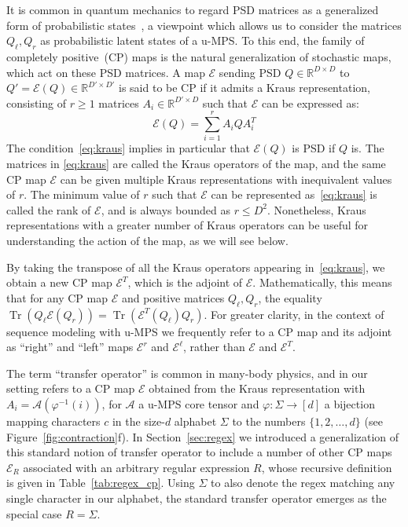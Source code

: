 \documentclass[twoside]{article}
\DeclareMathOperator{\Tr}{Tr}
\newcommand{\E}{\mc{E}}
\newcommand{\EL}{\mc{E}^{\scriptstyle \ell}}
\newcommand{\ER}{\mc{E}^{\scriptstyle r}}
\newcommand{\QL}{Q_{\ell}}
\newcommand{\QR}{Q_{r}}
\newcommand{\R}{\mathbb{R}}
\newcommand{\field}[1]{\R^{#1}}
\newcommand{\mc}[1]{\mathcal{#1}}
\begin{document}
It is common in quantum mechanics to regard PSD matrices as a generalized form of probabilistic states~\citep{nielsen2002}, a viewpoint which allows us to consider the matrices $\QL, \QR$ as probabilistic latent states of a u-MPS. To this end, the family of completely positive~(CP) maps is the natural generalization of stochastic maps, which act on these PSD matrices. A map $\E$ sending PSD $Q\in\field{D\times D}$ to $Q'=\E(Q)\in\field{D'\times D'}$ is said to be CP if it admits a Kraus representation, consisting of $r \geq 1$ matrices $A_i\in\field{D'\times D}$ such that $\E$ can be expressed as:
%
\begin{equation}
\label{eq:kraus}
\E(Q) = \sum_{i=1}^r A_i Q A_i^T
\end{equation}
%
The condition~\eqref{eq:kraus} implies in particular that $\E(Q)$ is PSD if $Q$ is. The matrices in \eqref{eq:kraus} are called the Kraus operators of the map, and the same CP map $\E$ can be given multiple Kraus representations with inequivalent values of $r$. The minimum value of $r$ such that $\E$ can be represented as~\eqref{eq:kraus} is called the rank of $\E$, and is always bounded as $r \leq D^2$. Nonetheless, Kraus representations with a greater number of Kraus operators can be useful for understanding the action of the map, as we will see below.

By taking the transpose of all the Kraus operators appearing in~\eqref{eq:kraus}, we obtain a new CP map $\E^T$, which is the adjoint of $\E$. Mathematically, this means that for any CP map $\E$ and positive matrices $\QL, \QR$, the equality $\Tr(\QL \E(\QR)) = \Tr(\E^T(\QL) \QR)$. For greater clarity, in the context of sequence modeling with u-MPS we frequently refer to a CP map and its adjoint as ``right'' and ``left'' maps $\ER$ and $\EL$, rather than $\E$ and $\E^T$.

The term ``transfer operator'' is common in many-body physics, and in our setting refers to a CP map $\E$ obtained from the Kraus representation with $A_i = \mc{A}(\varphi^{-1}(i))$, for $\mc{A}$ a u-MPS core tensor and $\varphi: \Sigma \to [d]$ a bijection mapping characters $c$ in the size-$d$ alphabet $\Sigma$ to the numbers $\{1, 2, \ldots, d\}$ (see Figure~\ref{fig:contraction}f). 
In Section~\ref{sec:regex} 
we introduced a generalization of this standard notion of transfer operator to include a number of other CP maps $\E_R$ associated with an arbitrary regular expression $R$, whose recursive definition is given in Table~\ref{tab:regex_cp}. 
Using $\Sigma$ to also denote the regex matching any single character in our alphabet, the standard transfer operator emerges as the special case $R = \Sigma$.
\end{document}

